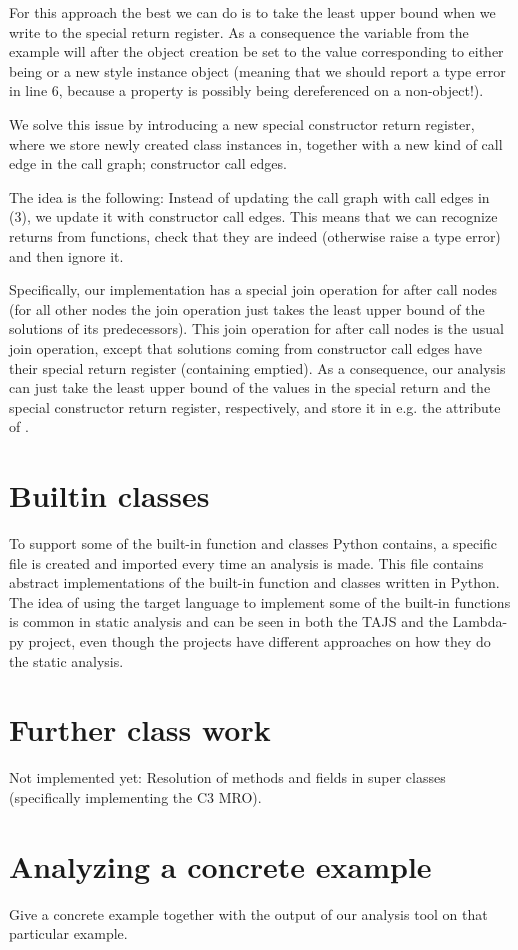 For this approach the best we can do is to take the least upper bound when we write to the special return register. As a consequence the variable  from the example will after the object creation be set to the value corresponding to either being  or a new style instance object (meaning that we should report a type error in line 6, because a property is possibly being dereferenced on a non-object!).

We solve this issue by introducing a new special constructor return register, where we store newly created class instances in, together with a new kind of call edge in the call graph; constructor call edges.

The idea is the following: Instead of updating the call graph with call edges in (3), we update it with constructor call edges. This means that we can recognize returns from  functions, check that they are indeed  (otherwise raise a type error) and then ignore it.

Specifically, our implementation has a special join operation for after call nodes (for all other nodes the join operation just takes the least upper bound of the solutions of its predecessors). This join operation for after call nodes is the usual join operation, except that solutions coming from constructor call edges have their special return register (containing  emptied). As a consequence, our analysis can just take the least upper bound of the values in the special return and the special constructor return register, respectively, and store it in e.g. the attribute  of .

\section{Builtin classes}
To support some of the built-in function and classes Python contains, a specific  file is created and imported every time an analysis is made. This  file contains abstract implementations of the built-in function and classes written in Python. The idea of using the target language to implement some of the built-in functions is common in static analysis and can be seen in both the TAJS\cite{tajs} and the Lambda-py\cite{lambdapy} project, even though the projects have different approaches on how they do the static analysis.


\section{Further class work}
Not implemented yet: Resolution of methods and fields in super classes (specifically implementing the C3 MRO).

\section{Analyzing a concrete example}
Give a concrete example together with the output of our analysis tool on that particular example.